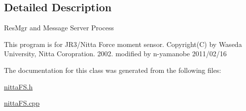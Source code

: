 \subsection{Detailed Description}
Res\-Mgr and Message Server Process

This program is for J\-R3/\-Nitta Force moment sensor. Copyright(\-C) by Waseda University, Nitta Coropration. 2002. modified by n-\/yamanobe 2011/02/16 

The documentation for this class was generated from the following files\-:\begin{DoxyCompactItemize}
\item 
\hyperlink{nittaFS_8h}{nitta\-F\-S.\-h}\item 
\hyperlink{nittaFS_8cpp}{nitta\-F\-S.\-cpp}\end{DoxyCompactItemize}
